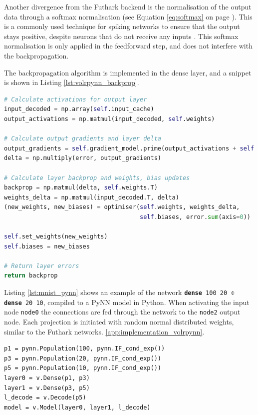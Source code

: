 Another divergence from the Futhark backend is the normalisation of the
output data through a softmax normalisation
(see Equation \ref{eq:softmax} on page \pageref{eq:softmax}).
This is a commonly used technique for spiking networks to ensure that the 
output stays positive, despite neurons that do not receive any inputs 
\cite{Rueckauer2017}.
This softmax normalisation is only applied in the feedforward step, and does
not interfere with the backpropagation.

The backpropagation algorithm is implemented in the dense layer, and a snippet
is shown in Listing \ref{lst:volrpynn_backprop}.

\begin{lstlisting}[language=Python,label={lst:volrpynn_backprop},caption={Part
of the backpropagation algorithm implemented in PyNN.}]
# Calculate activations for output layer
input_decoded = np.array(self.input_cache)
output_activations = np.matmul(input_decoded, self.weights)

# Calculate output gradients and layer delta
output_gradients = self.gradient_model.prime(output_activations + self.biases)
delta = np.multiply(error, output_gradients)

# Calculate layer backprop and weights, bias updates
backprop = np.matmul(delta, self.weights.T)
weights_delta = np.matmul(input_decoded.T, delta)
(new_weights, new_biases) = optimiser(self.weights, weights_delta,
                                      self.biases, error.sum(axis=0))

self.set_weights(new_weights)
self.biases = new_biases

# Return layer errors
return backprop
\end{lstlisting}

Listing \ref{lst:mnist_pynn} shows an example of the network
\texttt{\textbf{dense} 100 20 $\obar$ \textbf{dense} 20 10}, compiled to a PyNN model in Python.
When activating the input node \texttt{node0} the connections are fed through
the network to the \texttt{node2} output node.
Each projection is initiated with random normal distributed weights, similar
to the Futhark networks.
\ref{app:implementation_volrpynn}.

\begin{lstlisting}[caption={A simple MNIST network in the PyNN backend from the network in figure
    \ref{fig:volr-examples} on page \pageref{fig:volr-examples}.
    The neuron parameters for the LIF populations have been
omitted.},label={lst:mnist_pynn}]
p1 = pynn.Population(100, pynn.IF_cond_exp())
p3 = pynn.Population(20, pynn.IF_cond_exp())
p5 = pynn.Population(10, pynn.IF_cond_exp())
layer0 = v.Dense(p1, p3)
layer1 = v.Dense(p3, p5)
l_decode = v.Decode(p5)
model = v.Model(layer0, layer1, l_decode)
\end{lstlisting}

